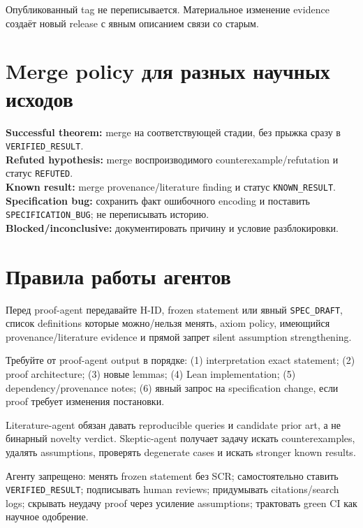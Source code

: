 \documentclass[11pt,a4paper]{article}
\newcommand{\status}[1]{\texttt{#1}}
\begin{document}
Опубликованный tag не переписывается. Материальное изменение evidence создаёт новый release с явным описанием связи со старым.

\section{Merge policy для разных научных исходов}

\textbf{Successful theorem:} merge на соответствующей стадии, без прыжка сразу в \status{VERIFIED\_RESULT}.\\
\textbf{Refuted hypothesis:} merge воспроизводимого counterexample/refutation и статус \status{REFUTED}.\\
\textbf{Known result:} merge provenance/literature finding и статус \status{KNOWN\_RESULT}.\\
\textbf{Specification bug:} сохранить факт ошибочного encoding и поставить \status{SPECIFICATION\_BUG}; не переписывать историю.\\
\textbf{Blocked/inconclusive:} документировать причину и условие разблокировки.

\section{Правила работы агентов}

Перед proof-agent передавайте H-ID, frozen statement или явный \status{SPEC\_DRAFT}, список definitions которые можно/нельзя менять, axiom policy, имеющийся provenance/literature evidence и прямой запрет silent assumption strengthening.

Требуйте от proof-agent output в порядке: (1) interpretation exact statement; (2) proof architecture; (3) новые lemmas; (4) Lean implementation; (5) dependency/provenance notes; (6) явный запрос на specification change, если proof требует изменения постановки.

Literature-agent обязан давать reproducible queries и candidate prior art, а не бинарный novelty verdict. Skeptic-agent получает задачу искать counterexamples, удалять assumptions, проверять degenerate cases и искать stronger known results.

\begin{dangerbox}
Агенту запрещено: менять frozen statement без SCR; самостоятельно ставить \status{VERIFIED\_RESULT}; подписывать human reviews; придумывать citations/search logs; скрывать неудачу proof через усиление assumptions; трактовать green CI как научное одобрение.
\end{dangerbox}
\end{document}
